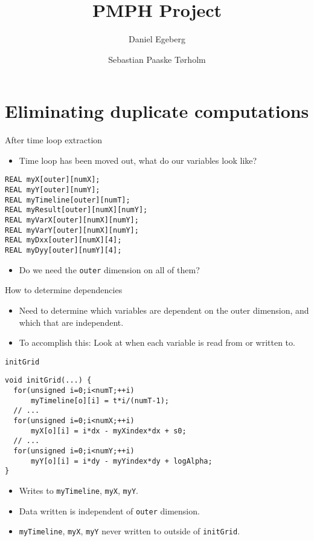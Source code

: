 \documentclass{beamer}
\title{PMPH Project}
\subtitle{}
\author{Daniel Egeberg \and Sebastian Paaske Tørholm}
\institute[Department of Computer Science]{Department of Computer Science}
\begin{document}
\frame[plain]{\titlepage}

\section{Eliminating duplicate computations}
\begin{frame}[fragile]{After time loop extraction}
    \begin{itemize}
        \item<1-> Time loop has been moved out, what do our variables look like? 
    \end{itemize}

    \begin{lstlisting}
REAL myX[outer][numX];
REAL myY[outer][numY];
REAL myTimeline[outer][numT];
REAL myResult[outer][numX][numY];
REAL myVarX[outer][numX][numY];
REAL myVarY[outer][numX][numY];
REAL myDxx[outer][numX][4];
REAL myDyy[outer][numY][4];
    \end{lstlisting}

    \begin{itemize}
        \item<1-> Do we need the \texttt{outer} dimension on all of them? 
    \end{itemize}
\end{frame}

\begin{frame}{How to determine dependencies}
    \begin{itemize}
        \item Need to determine which variables are dependent on the outer dimension,
              and which that are independent.
        \item<2-> To accomplish this: Look at when each variable is read from or written to.
    \end{itemize}
\end{frame}

\begin{frame}[fragile]{\texttt{initGrid}}
\begin{lstlisting}
void initGrid(...) {
  for(unsigned i=0;i<numT;++i)
      myTimeline[o][i] = t*i/(numT-1);
  // ...
  for(unsigned i=0;i<numX;++i)
      myX[o][i] = i*dx - myXindex*dx + s0;
  // ...
  for(unsigned i=0;i<numY;++i)
      myY[o][i] = i*dy - myYindex*dy + logAlpha;
} 
\end{lstlisting}
\begin{itemize}
    \item Writes to \texttt{myTimeline}, \texttt{myX}, \texttt{myY}.
    \item Data written is independent of \texttt{outer} dimension.
    \item \texttt{myTimeline}, \texttt{myX}, \texttt{myY} never written to outside of \texttt{initGrid}.
\end{itemize}
\end{frame}
\end{document}

